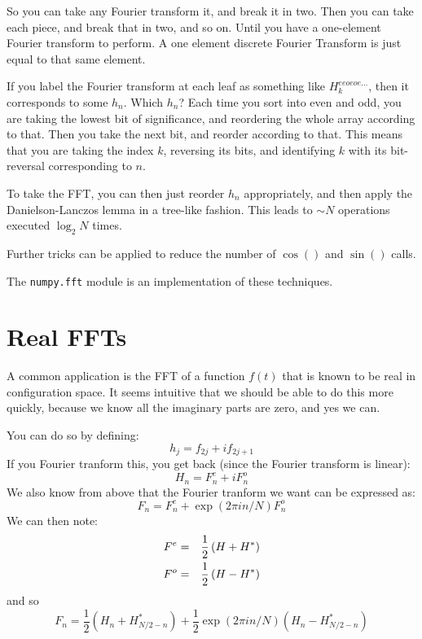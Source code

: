 So you can take any Fourier transform it, and break it in two. Then
you can take each piece, and break that in two, and so on. Until you
have a one-element Fourier transform to perform. A one element
discrete Fourier Transform is just equal to that same element.

If you label the Fourier transform at each leaf as something like
$H_k^{eeoeoe\ldots}$, then it corresponds to some $h_n$. Which $h_n$?
Each time you sort into even and odd, you are taking the lowest bit of
significance, and reordering the whole array according to that. Then
you take the next bit, and reorder according to that. This means that
you are taking the index $k$, reversing its bits, and identifying $k$
with its bit-reversal corresponding to $n$.  

To take the FFT, you can then just reorder $h_n$ appropriately, and
then apply the Danielson-Lanczos lemma in a tree-like fashion.  This
leads to $\sim N$ operations executed $\log_2 N$ times. 

Further tricks can be applied to reduce the number of $\cos()$ and
$\sin()$ calls.

The {\tt numpy.fft} module is an implementation of these techniques.

\section{Real FFTs}

A common application is the FFT of a function $f(t)$ that is known to
be real in configuration space. It seems intuitive that we should be
able to do this more quickly, because we know all the imaginary parts
are zero, and yes we can.

You can do so by defining:
\begin{equation}
h_j = f_{2j} + i f_{2j+1} 
\end{equation}
If you Fourier tranform this, you get back (since the Fourier
transform is linear):
\begin{equation}
H_n = F_n^e + i F_n^o
\end{equation}
We also know from above that the Fourier tranform we want can be
expressed as:
\begin{equation}
F_n = F_n^e + \exp(2\pi i n /N) F_n^o
\end{equation}
We can then note:
\begin{eqnarray}
F^e &=& \frac{1}{2} \left(H + H^\ast\right) \cr
F^o &=& \frac{1}{2} \left(H - H^\ast\right)
\end{eqnarray}
and so
\begin{equation}
  F_n = \frac{1}{2}\left(H_n + H_{N/2-n}^\ast\right) +
  \frac{1}{2} \exp(2\pi i n /N) \left(H_n - H_{N/2-n}^\ast\right)
\end{equation}

